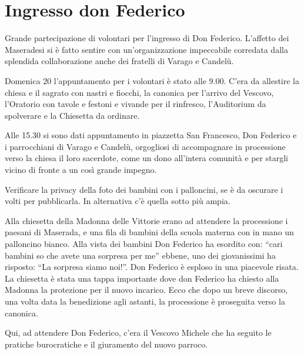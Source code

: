 \section{Ingresso don Federico}



Grande partecipazione di volontari per l'ingresso di Don Federico. L'affetto dei Maseradesi si è fatto sentire con un'organizzazione impeccabile corredata dalla splendida collaborazione anche dei fratelli di Varago e Candelù.


Domenica 20 l'appuntamento per i volontari è stato alle 9.00. C'era da allestire la chiesa e il sagrato con nastri e fiocchi, la canonica per l'arrivo del Vescovo, l'Oratorio con tavole e festoni e vivande per il rinfresco, l'Auditorium da spolverare e la Chiesetta da ordinare.


Alle 15.30 si sono dati appuntamento in piazzetta San Francesco, Don Federico e i parrocchiani di Varago e Candelù, orgogliosi di accompagnare in processione verso la chiesa il loro sacerdote, come un dono all'intera comunità e per stargli vicino di fronte a un così grande impegno.


Verificare la privacy della foto dei bambini con i palloncini, se è da oscurare i volti per pubblicarla.
In alternativa c'è quella sotto più ampia.


Alla chiesetta della Madonna delle Vittorie erano ad attendere la processione i paesani di Maserada, e una fila di bambini della scuola materna con in mano un palloncino bianco. Alla vista dei bambini Don Federico ha esordito con: ``cari bambini so che avete una sorpresa per me'' ebbene, uno dei giovanissimi ha risposto: ``La sorpresa siamo noi!''. Don Federico è esploso in una piacevole risata. La chiesetta è stata una tappa importante dove don Federico ha chiesto alla Madonna la protezione per il nuovo incarico. Ecco che dopo un breve discorso, una volta data la benedizione agli astanti, la processione è proseguita verso la canonica.

Qui, ad attendere Don Federico, c'era il Vescovo Michele che ha seguito le pratiche burocratiche e il giuramento del nuovo parroco.

